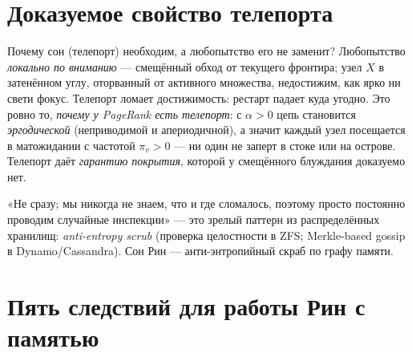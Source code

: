 \section{Доказуемое свойство телепорта}

Почему сон (телепорт) необходим, а любопытство его не заменит? Любопытство
\emph{локально по вниманию} — смещённый обход от текущего фронтира; узел $X$ в
затенённом углу, оторванный от активного множества, недостижим, как ярко ни свети
фокус. Телепорт ломает достижимость: рестарт падает куда угодно. Это ровно то,
\emph{почему у PageRank есть телепорт}: с $\alpha>0$ цепь становится
\emph{эргодической} (неприводимой и апериодичной), а значит каждый узел посещается
в матожидании с частотой $\pi_v>0$ — ни один не заперт в стоке или на острове.
Телепорт даёт \emph{гарантию покрытия}, которой у смещённого блуждания доказуемо
нет.

\begin{intuition}
«Не сразу; мы никогда не знаем, что и где сломалось, поэтому просто постоянно
проводим случайные инспекции» — это зрелый паттерн из распределённых хранилищ:
\emph{anti-entropy scrub} (проверка целостности в ZFS; Merkle-based gossip в
Dynamo/Cassandra). Сон Рин — анти-энтропийный скраб по графу памяти.
\end{intuition}

\section{Пять следствий для работы Рин с памятью}

